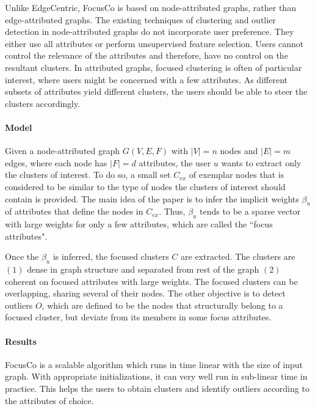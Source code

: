 \documentclass[11pt, oneside]{article}   	%
\begin{document}
\quad Unlike EdgeCentric, FocusCo \cite{focusco} is based on node-attributed graphs, rather than edge-attributed graphs.
The existing techniques of clustering and outlier detection in node-attributed graphs do not incorporate user preference.
They either use all attributes or perform unsupervised feature selection.
Users cannot control the relevance of the attributes and therefore, have no control on the resultant clusters.
In attributed graphs, focused clustering is often of particular interest, where users might be concerned with a few attributes. 
As different subsets of attributes yield different clusters, the users should be able to steer the clusters accordingly.

\paragraph{Model}
\quad

\quad Given a node-attributed graph $G(V,E,F)$ with $|V|=n$ nodes and $|E|=m$ edges, where each node has $|F| = d$ attributes, the user $u$ wants to extract only the clusters of interest.
To do so, a small set $C_{ex}$ of exemplar nodes that is considered to be similar to the type of nodes the clusters of interest should contain is provided.
The main idea of the paper is to infer the implicit weights $\beta_{u}$ of attributes that define the nodes in $C_{ex}$.
Thus, $\beta_u$ tends to be a sparse vector with large weights for only a few attributes, which are called the ``focus attributes".

\quad Once the $\beta_u$ is inferred, the focused clusters $C$ are extracted. 
The clusters are $(1)$ dense in graph structure and separated from rest of the graph $(2)$ coherent on focused attributes with large weights.
The focused clusters can be overlapping, sharing several of their nodes.
The other objective is to detect outliers $O$, which are defined to be the nodes that structurally belong to a focused cluster, but deviate from its members in some focus attributes.

\paragraph{Results}
\quad

\quad FocusCo is a scalable algorithm which runs in time linear with the size of input graph.
With appropriate initializations, it can very well run in sub-linear time in practice.
This helps the users to obtain clusters and identify outliers according to the attributes of choice.
\end{document}
